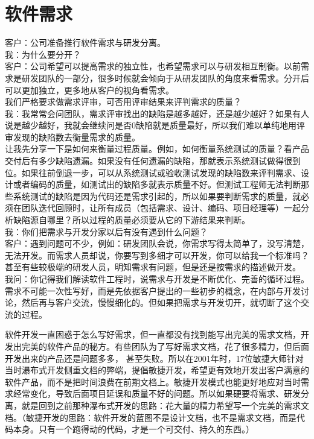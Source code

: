 \chapter{软件需求} %

客户：公司准备推行软件需求与研发分离。\\
我：为什么要分开？\\
客户：公司希望可以提高需求的独立性，也希望需求可以与研发相互制衡。以前需求是研发团队的一部分，很多时候就会倾向于从研发团队的角度来看需求。分开后可以更加独立，更多地从客户的视角看需求。\\
我们严格要求做需求评审，可否用评审结果来评判需求的质量？\\
我：我常常会问团队，需求评审找出的缺陷是越多越好，还是越少越好？如果有人说是越少越好，我就会继续问是否0缺陷就是质量最好，所以我们难以单纯地用评审发现的缺陷数去衡量需求的质量。\\
让我先分享一下是如何来衡量过程质量。例如，如何衡量系统测试的质量？看产品交付后有多少缺陷遗漏。如果没有任何遗漏的缺陷，那就表示系统测试做得很到位。如果往前倒退一步，可以从系统测试或验收测试发现的缺陷数来评判需求、设计或者编码的质量，如测试出的缺陷多就表示质量不好。但测试工程师无法判断那些系统测试的缺陷是因为代码还是需求引起的，所以如果要判断需求的质量，就必须在团队迭代回顾时，让所有成员（包括需求、设计、编码、项目经理等）一起分析缺陷源自哪里？所以过程的质量必须要从它的下游结果来判断。\\
我：你们把需求与开发分家以后有没有遇到什么问题？\\
客户：遇到问题可不少，例如：研发团队会说，你需求写得太简单了，没写清楚，无法开发。而需求人员却说，你要写到多细才可以开发，你可以给我一个标准吗？甚至有些较极端的研发人员，明知需求有问题，但是还是按需求的描述做开发。\\
我问：你记得我们解读软件工程时，说需求与开发是不断优化、完善的循环过程。需求不可能一次性写好，而是先依据客户提出的一些初步的概念，在内部与开发讨论，然后再与客户交流，慢慢细化的。但如果把需求与开发切开，就切断了这个交流的过程。

软件开发一直困惑于怎么写好需求，但一直都没有找到能写出完美的需求文档，开发出完美的软件产品的秘方。有些团队为了写好需求文档，花了很多精力，但后面开发出来的产品还是问题多多，
甚至失败。所以在2001年时，17位敏捷大师针对当时瀑布式开发侧重文档的弊端，提倡敏捷开发，希望更有效地开发出客户满意的软件产品，而不是把时间浪费在前期文档上。敏捷开发模式也能更好地应对当时需求经常变化，导致后面项目延误和质量不好的问题。所以如果硬要将需求、研发分离，就是回到之前那种瀑布式开发的思路：花大量的精力希望写一个完美的需求文档。（敏捷开发的思路：软件开发的蓝图不是设计文档，也不是需求文档，而是代码本身。只有一个跑得动的代码，才是一个可交付、持久的东西。）

